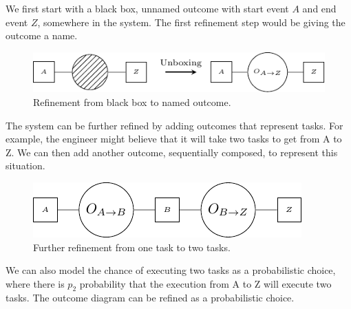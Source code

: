         We first start with a black box, unnamed outcome with start event $A$ and end event $Z$, somewhere in the system. The first refinement step would be giving the outcome a name.

      \begin{figure}[H]
            \begin{center}
                \includegraphics[scale = 1]{tikz/black_box.pdf}
            \end{center}
            \caption{Refinement from black box to named outcome.}
            \label{fig:bb}
        \end{figure}

    The system can be further refined by adding outcomes that represent tasks. For example, the engineer might believe that it will take two tasks to get from A to Z. We can then add another outcome, sequentially composed, to represent this situation.

       \begin{figure}[H]
            \begin{center}
                \includegraphics[scale = 1]{tikz/out_2.pdf}
            \end{center}
            \caption{Further refinement from one task to two tasks.}
            \label{fig:2_hops}
        \end{figure}

        We can also model the chance of executing two tasks as a probabilistic choice, where there is $p_2$ probability that the execution from A to Z will execute two tasks. The outcome diagram can be refined as a probabilistic choice.

